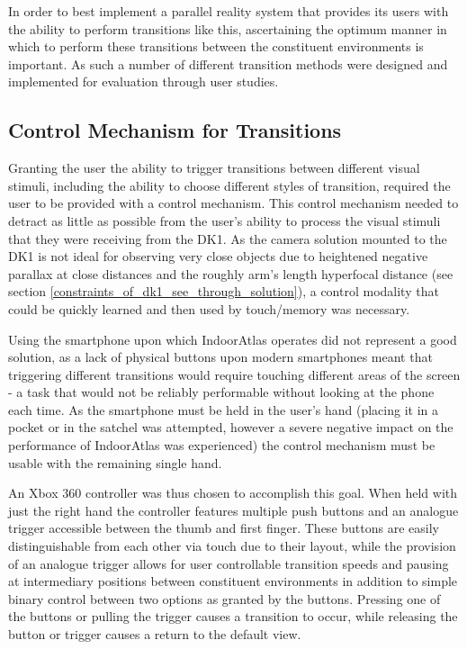 In order to best implement a parallel reality system that provides its users with the ability to perform transitions like this, ascertaining the optimum manner in which to perform these transitions between the constituent environments is important. As such a number of different transition methods were designed and implemented for evaluation through user studies.


\newpage

\subsection{Control Mechanism for Transitions}

Granting the user the ability to trigger transitions between different visual stimuli, including the ability to choose different styles of transition, required the user to be provided with a control mechanism. This control mechanism needed to detract as little as possible from the user's ability to process the visual stimuli that they were receiving from the DK1. As the camera solution mounted to the DK1 is not ideal for observing very close objects due to heightened negative parallax at close distances and the roughly arm's length hyperfocal distance (see section \ref{constraints_of_dk1_see_through_solution}), a control modality that could be quickly learned and then used by touch/memory was necessary.

Using the smartphone upon which IndoorAtlas operates did not represent a good solution, as a lack of physical buttons upon modern smartphones meant that triggering different transitions would require touching different areas of the screen - a task that would not be reliably performable without looking at the phone each time. As the smartphone must be held in the user's hand (placing it in a pocket or in the satchel was attempted, however a severe negative impact on the performance of IndoorAtlas was experienced) the control mechanism must be usable with the remaining single hand.

An Xbox 360 controller was thus chosen to accomplish this goal. When held with just the right hand the controller features multiple push buttons and an analogue trigger accessible between the thumb and first finger. These buttons are easily distinguishable from each other via touch due to their layout, while the provision of an analogue trigger allows for user controllable transition speeds and pausing at intermediary positions between constituent environments in addition to simple binary control between two options as granted by the buttons. Pressing one of the buttons or pulling the trigger causes a transition to occur, while releasing the button or trigger causes a return to the default view.

